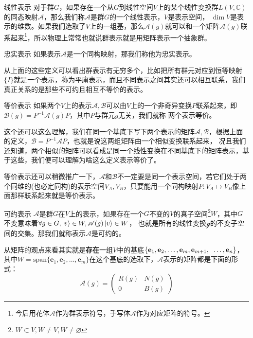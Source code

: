 \begin{define}{线性表示}
    对于群$G$，如果存在一个从$G$到线性空间$V$上的某个线性变换群$L(V,\mathbb{C})$的同态映射$\mathscr{A}$，那么我们称$\mathscr{A}$是群$G$的一个线性表示，$V$是表示空间，
    $\dim V$是表示的维数。如果我们选取了$V$上的一组基，那么$\mathscr{A}(g)$就可以和一个矩阵$\mathcal{A}(g)$联系起来\footnote[1]{今后用花体$\mathscr{A}$作为群表示符号，手写体$\mathcal{A}$作为对应矩阵的符号。}，所以物理上常常也就说群表示就是用矩阵表示一个抽象群。
\end{define}
\begin{define}{忠实表示}
    如果表示$\mathscr{A}$是一个同构映射，那我们称他为忠实表示。
\end{define}
从上面的这些定义可以看出群表示有无穷多个，比如把所有群元对应到恒等映射$\{I\}$就是一个表示，称为平庸表示，而且不同表示之间其实还可以相互联系，我们真正关系的是那些不可约且相互不等价的表示。
\begin{define}{等价表示}
    如果两个$V$上的表示$\mathscr{A},\mathscr{B}$可以由$V$上的一个非奇异变换$P$联系起来，即$\mathscr{B}(g)=P^{-1}\mathscr{A}(g)P$，其中$P$与群元$g$无关，我们就称
    两个表示等价。
\end{define}
这个还可以这么理解，我们在同一个基底下写下两个表示的矩阵$\mathcal{A},\mathcal{B}$，根据上面的定义，$\mathcal{B}=P^{-1}\mathcal{A}P$，也就是说这两组矩阵由一个相似变换联系起来，
况且我们还知道，两个相似的矩阵可以看成是同一个线性变换在不同基底下的矩阵表示，基于这些，我们便可以理解为啥这么定义表示等价了。

等价表示还可以稍微推广一下，$\mathscr{A}$和$\mathscr{B}$不一定要是同一个表示空间，若它们处于两个同维的(也必定同构)的表示空间$V_A,V_B$，只要能用一个同构映射$P:V_A\mapsto V_B$像上面那样联系起来就是等价表示。

\begin{define}{可约表示}
    $\mathscr{A}$是群$G$在$V$上的表示，如果存在一个$G$不变的$V$的真子空间\footnote[1]{$W\subset V,W\neq V,W\neq \varnothing$}$W$，其中$G$不变意味着$\forall g\in G, \ket{v}\in W,\mathscr{A}(g)\ket{v}\in W$，
    也就是所有的线性变换$\mathscr{g}$的不变子空间的交集。那我们就称表示$\mathscr{A}$是可约的。
\end{define}
从矩阵的观点来看其实就是\textbf{存在}一组$V$中的基底$\left\{\mathbf{e}_1,\mathbf{e}_2,\ldots,\mathbf{e}_m,\mathbf{e}_{m+1},\right.\\\left.\ldots,\mathbf{e}_n\right\}$，其中$W=\mathrm{span}\{\mathbf{e}_1,\mathbf{e}_2,\ldots,\mathbf{e}_m\}$在这个基底的选取下，$\mathscr{A}$表示的矩阵都是下面的形式：
\begin{equation}
    \label{eq:D.2}
    \mathcal{A}(g)=\begin{pmatrix}
    R(g) &N(g) \\
     {0} & B(g)
   \end{pmatrix}
\end{equation}

